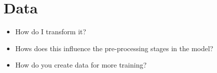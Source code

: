 \section{Data}

\begin{itemize}
  \item How do I transform it?
  \item Hows does this influence the pre-processing stages in the model?
  \item How do you create data for more training?
\end{itemize}